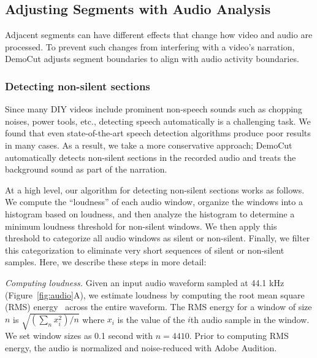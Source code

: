 \vspace{-0.03in}
\subsection{Adjusting Segments with Audio Analysis}

Adjacent segments can have different effects that change how video and audio are processed. To prevent such changes from interfering with a video's narration, DemoCut adjusts segment boundaries to align with audio activity boundaries.

\subsubsection{Detecting non-silent sections}
%
Since many DIY videos include prominent non-speech sounds such as
chopping noises, power tools, etc., detecting speech automatically is
a challenging task. We found that even state-of-the-art speech
detection algorithms produce poor results in many cases.
%
As a result, we take a more conservative approach; DemoCut
automatically detects non-silent sections in the recorded
audio and treats the background sound as part of the narration.

At a high level, our algorithm for detecting non-silent sections works
as follows. We compute the ``loudness'' of each audio window,
organize the windows into a histogram based on loudness, and then
analyze the histogram to determine a minimum loudness threshold for
non-silent windows. We then apply this threshold to categorize all
audio windows as silent or non-silent. Finally, we filter this
categorization to eliminate very short sequences of silent or non-silent samples. Here, we describe these steps in more detail:

\emph{Computing loudness.} Given an input audio waveform sampled at
44.1 kHz (Figure~\ref{fig:audio}A), we estimate loudness by computing
the root mean square (RMS) energy~\cite{Panagiotakis:2005eb} across
the entire waveform. The RMS energy
for a window of size $n$ is $\sqrt{(\sum_{n}{x_i^2})/n}$ where $x_i$ is the value of
the $i$th audio sample in the window. We set window sizes as 0.1 second with $n = 4410$. Prior to computing RMS energy, the audio is normalized and noise-reduced with Adobe Audition.

